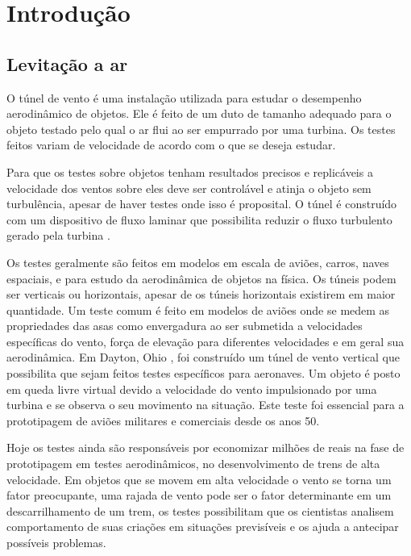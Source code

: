 
\chapter{Introdução} %

\section{Levitação a ar}

O túnel de vento é uma instalação utilizada para estudar o desempenho aerodinâmico de objetos. Ele é feito de um duto de tamanho adequado para o objeto testado pelo qual o ar flui ao ser empurrado por uma turbina. Os testes feitos variam de velocidade de acordo com o que se deseja estudar.


Para que os testes sobre objetos tenham resultados precisos e replicáveis a velocidade dos ventos sobre eles deve ser controlável e atinja o objeto sem turbulência, apesar de haver testes onde isso é proposital. O túnel é construído com um dispositivo de fluxo laminar que possibilita reduzir o fluxo turbulento gerado pela turbina \cite{mcdade1969}.


Os testes geralmente são feitos em modelos em escala de aviões, carros, naves espaciais, e para  estudo da aerodinâmica de objetos na física. Os túneis podem ser verticais ou horizontais, apesar de os túneis horizontais existirem em maior quantidade. Um teste comum é feito em modelos de aviões onde se medem as propriedades das asas como envergadura ao ser submetida a velocidades específicas do vento, força de elevação para diferentes velocidades e em geral sua aerodinâmica. Em Dayton, Ohio \cite{vertical1946}, foi construído um túnel de vento vertical que possibilita que sejam feitos testes específicos para aeronaves. Um objeto é posto em queda livre virtual devido a velocidade do vento impulsionado por uma turbina e se observa o seu movimento na situação. Este teste foi essencial para a prototipagem de aviões militares e comerciais desde os anos 50.


Hoje os testes ainda são responsáveis por economizar milhões de reais na fase de prototipagem em testes aerodinâmicos, no desenvolvimento de trens de alta velocidade\cite{kwon2001}. Em objetos que se movem em alta velocidade o vento se torna um fator preocupante, uma rajada de vento pode ser o fator determinante em um descarrilhamento de um trem, os testes possibilitam que os cientistas analisem  comportamento de suas criações em situações previsíveis e os ajuda a antecipar possíveis problemas.

